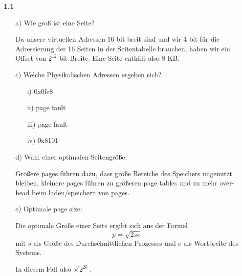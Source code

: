 \documentclass[a4paper,11pt]{article}
\author{\authorinfo}
\title{\titleinfo}
\date{\today}
\begin{document}
\maketitle


\begin{enumerate}
\item[\textbf{1.1}]

\begin{itemize}
    \item[a)] Wie groß ist eine Seite?

    Da unsere virtuellen Adressen 16 bit breit sind und wir 4 bit für die
    Adressierung der 16 Seiten in der Seitentabelle brauchen, haben wir ein
    Offset von \(2^{12}\) bit Breite.  Eine Seite enthält also 8 KB.

    \item[c)] Welche Physikalischen Adressen ergeben sich?
    \begin{enumerate}
        \item[i)] 0x0fe8
        \item[ii)] page fault
        \item[iii)] page fault
        \item[iv)] 0x8101
    \end{enumerate}

    \item[d)] Wahl einer optimalen Seitengröße:

    Größere pages führen dazu, dass große Bereiche des Speichers ungenutzt
    bleiben, kleinere pages führen zu größeren page tables und zu mehr over-
    head beim laden/speichern von pages.

    \item[e)] Optimale page size:

    Die optimale Größe einer Seite ergibt sich aus der Formel
    \[
        p = \sqrt{2 s e}
    \]
    mit \(s\) als Größe des Durchschnittlichen Prozesses und \(e\) als
    Wortbreite des Systems.
    
    In diesem Fall also \(\sqrt{2^{26}}\).
\end{itemize}

\end{enumerate}
\end{document}
